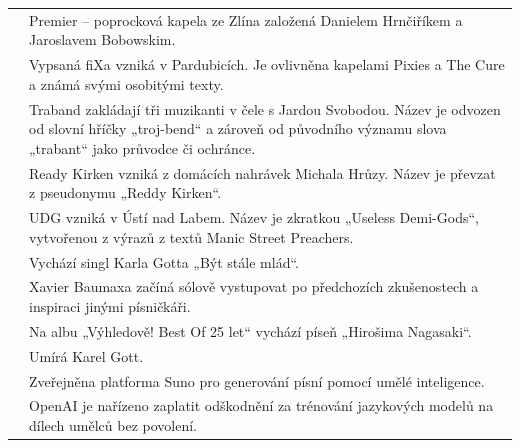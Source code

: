 \begin{xltabular}{\textwidth}{>{\raggedleft}p{2cm}X}
{} & Premier – poprocková kapela ze Zlína založená Danielem Hrnčiříkem a Jaroslavem Bobowskim. \\
{} & Vypsaná fiXa vzniká v Pardubicích. Je ovlivněna kapelami Pixies a The Cure a známá svými osobitými texty. \\
{} & Traband zakládají tři muzikanti v čele s Jardou Svobodou. Název je odvozen od slovní hříčky „troj-bend“ a zároveň od původního významu slova „trabant“ jako průvodce či ochránce. \\
{} & Ready Kirken vzniká z domácích nahrávek Michala Hrůzy. Název je převzat z pseudonymu „Reddy Kirken“. \\
{} & UDG vzniká v Ústí nad Labem. Název je zkratkou „Useless Demi-Gods“, vytvořenou z výrazů z textů Manic Street Preachers. \\
{} & Vychází singl Karla Gotta „Být stále mlád“. \\
{} & Xavier Baumaxa začíná sólově vystupovat po předchozích zkušenostech a inspiraci jinými písničkáři. \\
{} & Na albu „Výhledově! Best Of 25 let“ vychází píseň „Hirošima Nagasaki“. \\
{} & Umírá Karel Gott. \\
{} & Zveřejněna platforma Suno pro generování písní pomocí umělé inteligence. \\
{} & OpenAI je nařízeno zaplatit odškodnění za trénování jazykových modelů na dílech umělců bez povolení. \\

\end{xltabular}

\normalsize
\restoregeometry
